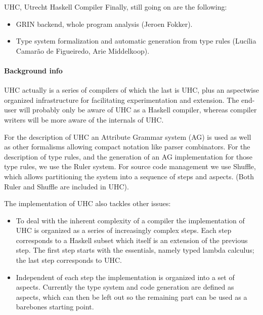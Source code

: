 \begin{hcarentry}[section]{UHC, Utrecht Haskell Compiler}
Finally, still going on are the following:

\begin{itemize}
\item
  GRIN backend, whole program analysis (Jeroen Fokker).
\item
  Type system formalization and automatic generation from type rules
  (Luc\'ilia Camar\~ao de Figueiredo, Arie Middelkoop).
\end{itemize}


\paragraph{Background info}

UHC actually is a series of compilers of which the last is UHC, plus
an aspectwise organized infrastructure for facilitating experimentation and extension.
The end-user will probably only be aware of UHC as a Haskell compiler,
whereas compiler writers will be more
aware of the internals of UHC.

For the description of UHC an Attribute Grammar system (AG) is used as well as other
formalisms allowing compact notation like parser combinators.  For the
description of type rules, and the generation of an AG implementation for
those type rules, we use the Ruler system.
For source code management we use Shuffle, which allows partitioning the system into a sequence of steps and aspects.
(Both Ruler and Shuffle are included in UHC).

The implementation of UHC also tackles other issues:
\begin{itemize}
\item
  To deal with the inherent complexity of a compiler the implementation of UHC is organized as a series of
  increasingly complex steps.
  Each step corresponds to a Haskell subset which itself is an extension
  of the previous step.
  The first step starts with the essentials, namely typed lambda
  calculus; the last step corresponds to UHC.

\item
 Independent of each step the implementation is organized into a set of aspects.
  Currently the type system and code generation are defined as aspects,
  which can then be left out so the remaining part can be used as a barebones starting point.


\end{itemize}
\end{hcarentry}
